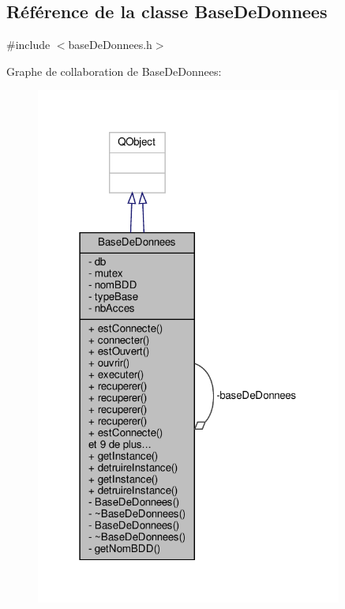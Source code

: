 \hypertarget{class_base_de_donnees}{}\subsection{Référence de la classe Base\+De\+Donnees}
\label{class_base_de_donnees}


{\ttfamily \#include $<$base\+De\+Donnees.\+h$>$}



Graphe de collaboration de Base\+De\+Donnees\+:\nopagebreak
\begin{figure}[H]
\begin{center}
\leavevmode
\includegraphics[width=286pt]{class_base_de_donnees__coll__graph}
\end{center}
\end{figure}
